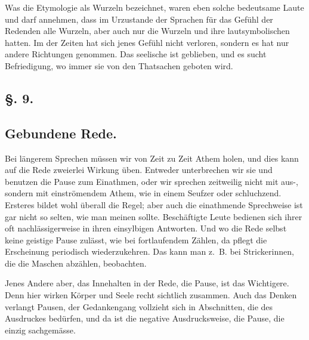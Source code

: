 {\largerpage[-1]Was die Etymologie als Wurzeln bezeichnet, waren eben solche bedeutsame Laute und  darf annehmen, dass im Urzustande der Sprachen für das Gefühl der Redenden alle Wurzeln, aber auch nur die Wurzeln und ihre  lautsymbolischen  hatten. Im  der Zeiten hat sich jenes Gefühl nicht verloren, sondern es hat nur andere Richtungen genommen. Das seelische  ist geblieben, und es sucht Befriedigung, wo immer sie von den Thatsachen geboten wird.

\subsection*{§. 9.}\label{III.II.II.9}
\subsection*{Gebundene Rede.}
Bei längerem Sprechen müssen wir von Zeit zu Zeit Athem holen, und dies kann auf die Rede zweierlei Wirkung üben. Entweder unterbrechen wir sie und benutzen die Pause zum Einathmen, oder wir sprechen zeitweilig nicht mit \mbox{aus-,} sondern mit einströmendem Athem, wie in einem Seufzer oder schluchzend. Ersteres bildet wohl überall die Regel; aber auch die einathmende Sprechweise ist gar nicht so selten, wie man meinen sollte. Beschäftigte Leute bedienen sich ihrer oft nachlässigerweise in ihren einsylbigen Antworten. Und wo die Rede selbst keine geistige Pause zulässt, wie bei fortlaufendem Zählen, da pflegt die Erscheinung periodisch wiederzukehren. Das kann man z.~B. bei Strickerinnen, die die Maschen abzählen, beobachten.

Jenes Andere aber, das Innehalten in der Rede, die Pause, ist das Wichtigere. Denn hier wirken Körper und Seele recht sichtlich zusammen. Auch \label{sp.226} das Denken verlangt Pausen, der Gedankengang vollzieht sich in Abschnitten, die des Ausdruckes bedürfen, und da ist die negative Ausdrucksweise, die Pause, die einzig sachgemässe.

}
